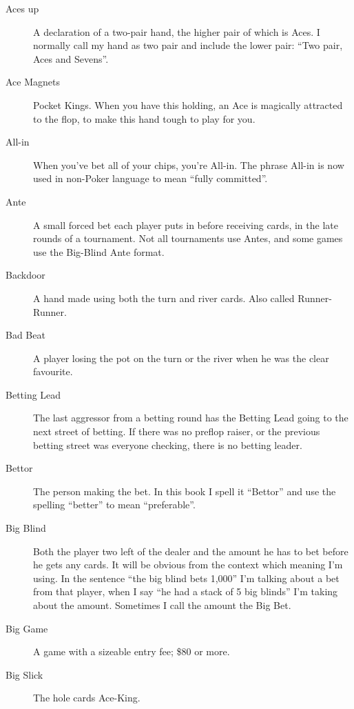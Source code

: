 \begin{description}

\item[Aces up] A declaration of a two-pair hand, the higher pair of
which is Aces. I normally call my hand as two pair and include the
lower pair: ``Two pair, Aces and Sevens''.

\item[Ace Magnets] Pocket Kings. When you have this holding, an Ace is
magically attracted to the flop, to make this hand tough to play for
you.

\item[All-in] When you've bet all of your chips, you're All-in. The
phrase All-in is now used in non-Poker language to mean ``fully
committed''.

\item[Ante] A small forced bet each player puts in before receiving
cards, in the late rounds of a tournament. Not all tournaments use
Antes, and some games use the Big-Blind Ante format.

\item[Backdoor] A hand made using both the turn and river cards. Also
called Runner-Runner.

\item[Bad Beat] A player losing the pot on the turn or the river when
he was the clear favourite.

\item[Betting Lead] The last aggressor from a betting round has the
Betting Lead going to the next street of betting. If there was no
preflop raiser, or the previous betting street was everyone checking,
there is no betting leader.

\item[Bettor] The person making the bet. In this book I spell it ``Bettor''
and use the spelling ``better'' to mean ``preferable''.

\item[Big Blind] Both the player two left of the dealer and the amount
he has to bet before he gets any cards. It will be obvious from the
context which meaning I'm using. In the sentence ``the big blind bets
1,000'' I'm talking about a bet from that player, when I say ``he had
a stack of 5 big blinds'' I'm taking about the amount. Sometimes I
call the amount the Big Bet.

\item[Big Game] A game with a sizeable entry fee; \$80 or more.

\item[Big Slick] The hole cards Ace-King.


\end{description}
